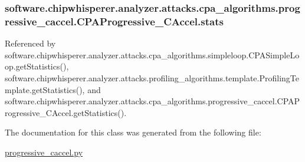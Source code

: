 \hypertarget{classsoftware_1_1chipwhisperer_1_1analyzer_1_1attacks_1_1cpa__algorithms_1_1progressive__caccel_1_1CPAProgressive__CAccel_a9669a367b7ef01f897e7aa1f62d8381d}{}
\subsubsection[{stats}]{\setlength{\rightskip}{0pt plus 5cm}software.\+chipwhisperer.\+analyzer.\+attacks.\+cpa\+\_\+algorithms.\+progressive\+\_\+caccel.\+C\+P\+A\+Progressive\+\_\+\+C\+Accel.\+stats}\label{classsoftware_1_1chipwhisperer_1_1analyzer_1_1attacks_1_1cpa__algorithms_1_1progressive__caccel_1_1CPAProgressive__CAccel_a9669a367b7ef01f897e7aa1f62d8381d}


Referenced by software.\+chipwhisperer.\+analyzer.\+attacks.\+cpa\+\_\+algorithms.\+simpleloop.\+C\+P\+A\+Simple\+Loop.\+get\+Statistics(), software.\+chipwhisperer.\+analyzer.\+attacks.\+profiling\+\_\+algorithms.\+template.\+Profiling\+Template.\+get\+Statistics(), and software.\+chipwhisperer.\+analyzer.\+attacks.\+cpa\+\_\+algorithms.\+progressive\+\_\+caccel.\+C\+P\+A\+Progressive\+\_\+\+C\+Accel.\+get\+Statistics().



The documentation for this class was generated from the following file\+:\begin{DoxyCompactItemize}
\item 
\hyperlink{progressive__caccel_8py}{progressive\+\_\+caccel.\+py}\end{DoxyCompactItemize}
